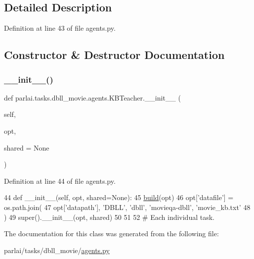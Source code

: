 \subsection{Detailed Description}


Definition at line 43 of file agents.\+py.



\subsection{Constructor \& Destructor Documentation}
\mbox{\label{classparlai_1_1tasks_1_1dbll__movie_1_1agents_1_1KBTeacher_a073db440502a585121d5207fc9d9f992}} 
\subsubsection{\texorpdfstring{\+\_\+\+\_\+init\+\_\+\+\_\+()}{\_\_init\_\_()}}
{\footnotesize\ttfamily def parlai.\+tasks.\+dbll\+\_\+movie.\+agents.\+K\+B\+Teacher.\+\_\+\+\_\+init\+\_\+\+\_\+ (\begin{DoxyParamCaption}\item[{}]{self,  }\item[{}]{opt,  }\item[{}]{shared = {\ttfamily None} }\end{DoxyParamCaption})}



Definition at line 44 of file agents.\+py.


\begin{DoxyCode}
44     \textcolor{keyword}{def }\_\_init\_\_(self, opt, shared=None):
45         \hyperlink{namespaceparlai_1_1mturk_1_1tasks_1_1talkthewalk_1_1download_a8c0fbb9b6dfe127cb8c1bd6e7c4e33fd}{build}(opt)
46         opt[\textcolor{stringliteral}{'datafile'}] = os.path.join(
47             opt[\textcolor{stringliteral}{'datapath'}], \textcolor{stringliteral}{'DBLL'}, \textcolor{stringliteral}{'dbll'}, \textcolor{stringliteral}{'movieqa-dbll'}, \textcolor{stringliteral}{'movie\_kb.txt'}
48         )
49         super().\_\_init\_\_(opt, shared)
50 
51 
52 \textcolor{comment}{# Each individual task.}
\end{DoxyCode}


The documentation for this class was generated from the following file\+:\begin{DoxyCompactItemize}
\item 
parlai/tasks/dbll\+\_\+movie/\hyperlink{parlai_2tasks_2dbll__movie_2agents_8py}{agents.\+py}\end{DoxyCompactItemize}
